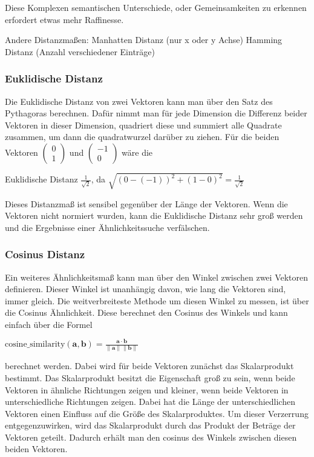 Diese Komplexen semantischen Unterschiede, oder Gemeinsamkeiten zu erkennen erfordert etwas mehr Raffinesse.

Andere Distanzmaßen:
Manhatten Distanz (nur x oder y Achse)
Hamming Distanz (Anzahl verschiedener Einträge)

\subsubsection{Euklidische Distanz}

Die Euklidische Distanz von zwei Vektoren kann man über den Satz des Pythagoras berechnen.
Dafür nimmt man für jede Dimension die Differenz beider Vektoren in dieser Dimension, quadriert diese und summiert alle Quadrate zusammen, um dann die quadratwurzel darüber zu ziehen.
Für die beiden Vektoren 
$\begin{pmatrix}0\\1\end{pmatrix}$
und 
$\begin{pmatrix}-1\\0\end{pmatrix}$
wäre die

Euklidische Distanz $\frac{1}{\sqrt{2}}$, da $\sqrt{(0-(-1))^2 + (1-0)^2}=\frac{1}{\sqrt{2}}$

Dieses Distanzmaß ist sensibel gegenüber der Länge der Vektoren.
Wenn die Vektoren nicht normiert wurden, kann die Euklidische Distanz sehr groß werden und die Ergebnisse einer Ähnlichkeitssuche verfälschen.


\subsubsection{Cosinus Distanz}

Ein weiteres Ähnlichkeitsmaß kann man über den Winkel zwischen zwei Vektoren definieren.
Dieser Winkel ist unanhängig davon, wie lang die Vektoren sind, immer gleich.
Die weitverbreiteste Methode um diesen Winkel zu messen, ist über die Cosinus Ähnlichkeit.
Diese berechnet den Cosinus des Winkels und kann einfach über die Formel

$\text{cosine\_similarity}(\mathbf{a}, \mathbf{b}) = \frac{\mathbf{a} \cdot \mathbf{b}}{\|\mathbf{a}\| \|\mathbf{b}\|}$

berechnet werden.
Dabei wird für beide Vektoren zunächst das Skalarprodukt bestimmt.
Das Skalarprodukt besitzt die Eigenschaft groß zu sein, wenn beide Vektoren in ähnliche Richtungen zeigen und kleiner, wenn beide Vektoren in unterschiedliche Richtungen zeigen.
Dabei hat die Länge der unterschiedlichen Vektoren einen Einfluss auf die Größe des Skalarproduktes.
Um dieser Verzerrung entgegenzuwirken, wird das Skalarprodukt durch das Produkt der Beträge der Vektoren geteilt.
Dadurch erhält man den cosinus des Winkels zwischen diesen beiden Vektoren.

